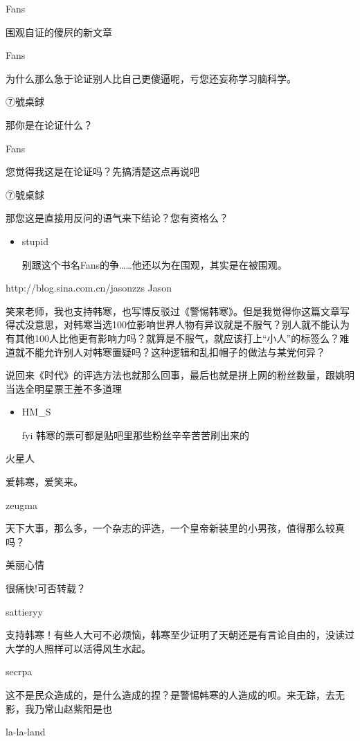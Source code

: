 Fans

围观自证的傻屄的新文章

Fans

为什么那么急于论证别人比自己更傻逼呢，亏您还妄称学习脑科学。

⑦號桌銶

那你是在论证什么？

Fans

您觉得我这是在论证吗？先搞清楚这点再说吧

⑦號桌銶

那您这是直接用反问的语气来下结论？您有资格么？

\begin{itemize}[<+->]
\item
  stupid

  别跟这个书名Fans的争\ldots{}\ldots{}他还以为在围观，其实是在被围观。
\end{itemize}

http://blog.sina.com.cn/jasonzzs Jason

笑来老师，我也支持韩寒，也写博反驳过《警惕韩寒》。但是我觉得你这篇文章写得忒没意思，对韩寒当选100位影响世界人物有异议就是不服气？别人就不能认为有其他100人比他更有影响力吗？就算是不服气，就应该打上``小人''的标签么？难道就不能允许别人对韩寒置疑吗？这种逻辑和乱扣帽子的做法与某党何异？

说回来《时代》的评选方法也就那么回事，最后也就是拼上网的粉丝数量，跟姚明当选全明星票王差不多道理

\begin{itemize}[<+->]
\item
  HM\_S

  fyi 韩寒的票可都是贴吧里那些粉丝辛辛苦苦刷出来的
\end{itemize}

火星人

爱韩寒，爱笑来。

zeugma

天下大事，那么多，一个杂志的评选，一个皇帝新装里的小男孩，值得那么较真吗？

美丽心情

很痛快!可否转载？

sattieryy

支持韩寒！有些人大可不必烦恼，韩寒至少证明了天朝还是有言论自由的，没读过大学的人照样可以活得风生水起。

secrpa

这不是民众造成的，是什么造成的捏？是警惕韩寒的人造成的呗。来无踪，去无影，我乃常山赵紫阳是也

la-la-land

